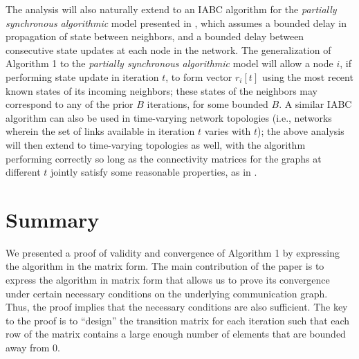 \documentclass[letterpaper, 12pt]{article}
\begin{document}
The analysis will also naturally extend to an IABC algorithm for the 
{\em partially synchronous algorithmic} model
presented in \cite{AA_convergence_markov}, which assumes a bounded
delay in propagation of state between neighbors, and a bounded delay between
consecutive state updates at each node in the network.
The generalization of Algorithm 1 to the
{\em partially synchronous algorithmic} model will allow a node $i$,
if performing state update in iteration $t$, to form vector $r_i[t]$
using the most recent known states of its incoming neighbors; these states
of the neighbors may correspond to any of the prior $B$ iterations,
for some bounded $B$.
A similar IABC algorithm can also be used 
in time-varying network topologies (i.e., networks wherein the set
of links available in iteration $t$ varies with $t$);
the above analysis will
then extend to time-varying topologies as well, with the
algorithm performing correctly so long as
the connectivity matrices for the graphs at different $t$ 
jointly satisfy some reasonable properties, as in \cite{jadbabaie_consensus,Benezit,vaidyaII}.



\section{Summary}

We presented a proof of validity and convergence of Algorithm 1 by
expressing the algorithm in the matrix form. The main contribution of
the paper is to express the algorithm in matrix form that allows us to
prove its convergence under certain necessary conditions on the underlying
communication graph. Thus, the proof implies that the necessary conditions
are also sufficient. 
The key to the proof is to ``design'' the transition matrix for each
iteration such that each row of the matrix contains a large enough number
of elements that are bounded away from 0.
\end{document}
